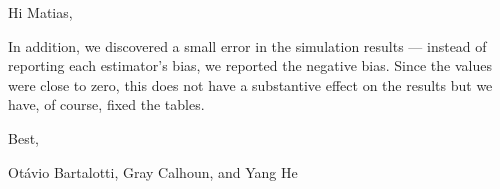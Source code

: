 \documentclass[12pt,fleqn]{article}
\begin{document}
\noindent%
Hi Matias,

\strut

In addition, we discovered a small error in the simulation results ---
instead of reporting each estimator's bias, we reported the negative
bias. Since the values were close to zero, this does not have a
substantive effect on the results but we have, of course, fixed the
tables.

\noindent%
Best,

\noindent%
Ot\'avio Bartalotti, Gray Calhoun, and Yang He
\end{document}

